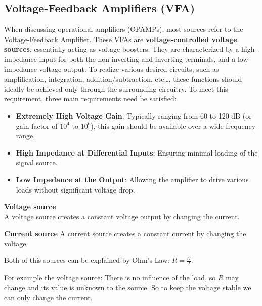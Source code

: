 \documentclass[
  letterpaper,
]{scrbook}
\providecommand{\tightlist}{%
  \setlength{\itemsep}{0pt}\setlength{\parskip}{0pt}}
\begin{document}
\subsection{Voltage-Feedback Amplifiers (VFA)}\label{sec-VFA}

When discussing operational amplifiers (OPAMPs), most sources refer to
the Voltage-Feedback Amplifier. These VFAs are
\textbf{voltage-controlled voltage sources}, essentially acting as
voltage boosters. They are characterized by a high-impedance input for
both the non-inverting and inverting terminals, and a low-impedance
voltage output. To realize various desired circuits, such as
amplification, integration, addition/subtraction, etc\ldots, these
functions should ideally be achieved only through the surrounding
circuitry. To meet this requirement, three main requirements need be
satisfied:

\begin{itemize}
\tightlist
\item
  \textbf{Extremely High Voltage Gain}: Typically ranging from 60 to 120
  dB (or gain factor of \(10^4\) to \(10^6\)), this gain should be
  available over a wide frequency range.
\item
  \textbf{High Impedance at Differential Inputs}: Ensuring minimal
  loading of the signal source.
\item
  \textbf{Low Impedance at the Output}: Allowing the amplifier to drive
  various loads without significant voltage drop.
\end{itemize}

\begin{tcolorbox}[enhanced jigsaw, title=\textcolor{quarto-callout-tip-color}{\faLightbulb}\hspace{0.5em}{Difference between a voltage source and a current source}, colback=white, bottomrule=.15mm, coltitle=black, colbacktitle=quarto-callout-tip-color!10!white, toptitle=1mm, colframe=quarto-callout-tip-color-frame, rightrule=.15mm, arc=.35mm, leftrule=.75mm, bottomtitle=1mm, titlerule=0mm, toprule=.15mm, opacitybacktitle=0.6, opacityback=0, left=2mm, breakable]

\textbf{Voltage source}\\
A voltage source creates a constant voltage output by changing the
current.

\textbf{Current source} A current source creates a constant current by
changing the voltage.

Both of this sources can be explained by Ohm's Law: \(R = \frac{U}{I}\).

For example the voltage source: There is no influence of the load, so
\(R\) may change and its value is unknown to the source. So to keep the
voltage stable we can only change the current.

\end{tcolorbox}
\end{document}
